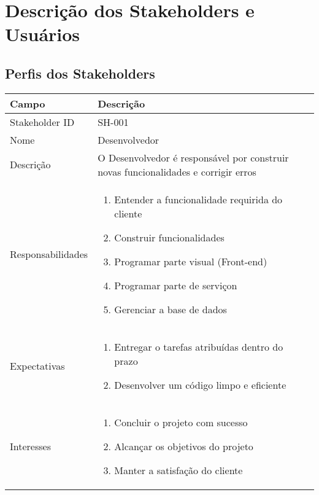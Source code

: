 \chapter{Descrição dos Stakeholders e Usuários}

\section{Perfis dos Stakeholders}

\begin{tabularx}{\textwidth}{| l | X |}
    \hline
    Campo             & Descrição                                                                                                                                                                           \\ \hline
    
    Stakeholder ID    & SH-001                                                                                                                                                                              \\ \hline
    
    Nome              & Desenvolvedor                                                                                                                                                                       \\ \hline
    
    Descrição         & O Desenvolvedor é responsável por construir novas funcionalidades e corrigir erros
    \\ \hline
  
    Responsabilidades & 
    \begin{enumerate}
        \item Entender a funcionalidade requirida do cliente
        \item Construir funcionalidades
        \item Programar parte visual (Front-end)
        \item Programar parte de serviçon
        \item Gerenciar a base de dados
    \end{enumerate}

    \\ \hline
    Expectativas      & 
    \begin{enumerate}
        \item Entregar o tarefas atribuídas dentro do prazo
        \item Desenvolver um código limpo e eficiente
    \end{enumerate}
    
    \\ \hline
    Interesses        & 
    \begin{enumerate}
        \item Concluir o projeto com sucesso
        \item Alcançar os objetivos do projeto
        \item Manter a satisfação do cliente
    \end{enumerate}

    \\ \hline    
\end{tabularx}

